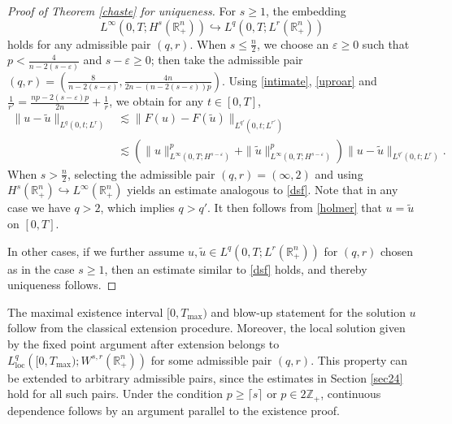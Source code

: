 \documentclass[preprint,compress,12pt]{elsarticle}
\numberwithin{equation}{section}
\begin{document}
\begin{proof}[Proof of Theorem \ref{chaste} for uniqueness]
	For $s\geq1 $,  the embedding
	\[L^{\infty}\left(0,T;H^{s}(\mathbb{R}^{n}_{+})\right)\hookrightarrow L^{q}\left(0,T;L^{r}(\mathbb{R}^{n}_{+})\right)\] holds for any admissible pair $(q,r)$. When  $s\leq \frac{n}{2}$, we choose an $\varepsilon\geq 0$ such that $p<\frac{4}{n-2(s-\varepsilon)}$ and $s-\varepsilon\geq0$; then take the admissible pair $(q,r)=(\frac{8}{n-2(s-\varepsilon)},\frac{4n}{2n-(n-2(s-\varepsilon))p})$. Using \eqref{intimate}, \eqref{uproar} and $\frac{1}{r'}=\frac{np-2(s-\varepsilon)p}{2n}+\frac{1}{r}$, we obtain for any $t\in[0,T]$,
	\begin{equation}\label{dsf}
		\begin{aligned}
			\|u-\tilde{u}\|_{L^{q}(0,t;L^{r})}&\lesssim \|F(u)-F(\tilde{u})\|_{L^{q'}(0,t;L^{r'})}\\
			&\lesssim  \left(\|u\|_{L^{\infty}(0,T;H^{s-\varepsilon})}^{p} + \|\tilde{u}\|_{L^{\infty}(0,T;H^{s-\varepsilon})}^{p}\right)\|u-\tilde{u}\|_{L^{q'}(0,t;L^{r})}.
		\end{aligned}
	\end{equation}
	When $s>\frac{n}{2}$, selecting the admissible pair $(q,r)=(\infty, 2)$  and using $H^{s}(\mathbb{R}_{+}^{n})\hookrightarrow L^{\infty}(\mathbb{R}_{+}^{n})$ yields an estimate analogous to \eqref{dsf}. Note that in any case we have $q>2$, which implies $q>q'$. It then follows from \eqref{holmer} that $u = \tilde{u}$ on $[0, T]$.
	
	In other cases, if we further assume $u, \tilde{u} \in L^{q}(0,T; L^{r}(\mathbb{R}^{n}_{+}))$ for $(q, r)$ chosen as in the case $s \geq 1$, then an estimate similar to \eqref{dsf} holds, and thereby uniqueness follows.
\end{proof}
The maximal existence interval $[0,T_{\max})$ and blow-up statement for the solution $u$ follow from the classical extension procedure. Moreover, the local solution given by the fixed point argument after extension belongs to $ L_{\mathrm{loc}}^{q}\left([0,T_{\max});W^{s,r}(\mathbb{R}^{n}_{+})\right)$ for some admissible pair $(q,r)$. This property can be  extended to arbitrary admissible pairs, since the estimates in Section \ref{sec24} hold for all such pairs. Under the condition $p\geq \lceil s\rceil$ or $p\in2\mathbb{Z}_{+}$, continuous dependence follows by an argument parallel to the existence proof.
\end{document}
